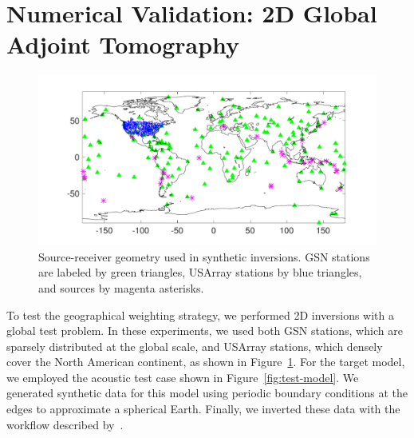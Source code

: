 \section{Numerical Validation: 2D Global Adjoint Tomography}

\begin{figure}
    \centering
    \begin{minipage}[t]{.9\columnwidth}
    \includegraphics[width=.95\textwidth]{ch-weighting/figures/network.pdf}  %
    \end{minipage}
  \caption[source-receiver geometry used in synthetic inversions]
  {\small{Source-receiver geometry used in synthetic inversions.  
GSN stations are labeled by green triangles, USArray stations by blue triangles, and sources 
by magenta asterisks.
}}
\label{fig:test-src-sta}
\end{figure}

To test the geographical weighting strategy, 
we performed 2D inversions with a global test problem.  In these experiments, we used both GSN stations, which are sparsely distributed 
at the global scale, and USArray stations, which densely cover the North American continent, as shown in Figure~\ref{fig:test-src-sta}.
For the target model, we employed the acoustic test case  shown in Figure~\ref{fig:test-model}.  We generated synthetic data for this model using periodic boundary 
conditions at the edges to approximate a spherical Earth.  Finally, we inverted these data  with the workflow described by~\cite{Modrak2018}.  

